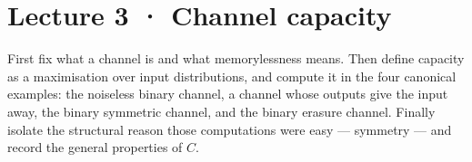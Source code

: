 \clearpage
{\small\tableofcontents}

\clearpage
\section*{Lecture 3 · Channel capacity}
{}
\begin{strand}
First fix what a channel is and what memorylessness means. Then define capacity
as a maximisation over input distributions, and compute it in the four canonical
examples: the noiseless binary channel, a channel whose outputs give the input
away, the binary symmetric channel, and the binary erasure channel. Finally
isolate the structural reason those computations were easy --- symmetry --- and
record the general properties of $C$.
\end{strand}



\clearpage


\clearpage


\clearpage


\clearpage


\clearpage



